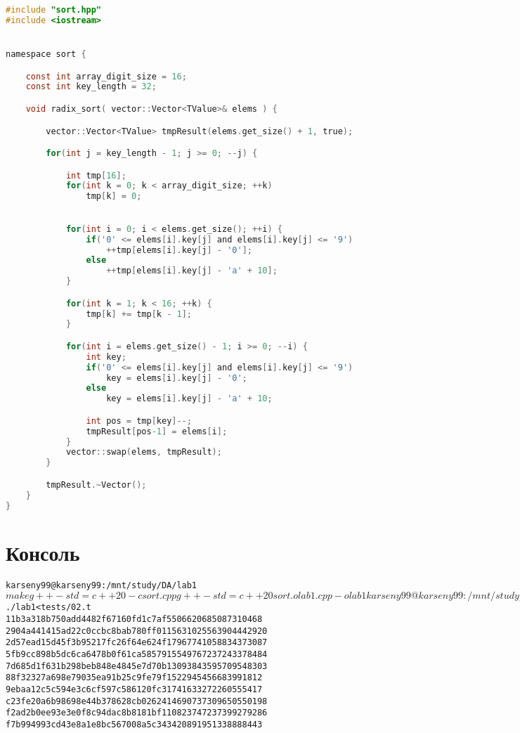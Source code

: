 \begin{lstlisting}[language=C]
#include "sort.hpp"
#include <iostream>


namespace sort {

    const int array_digit_size = 16;
    const int key_length = 32;

    void radix_sort( vector::Vector<TValue>& elems ) {

        vector::Vector<TValue> tmpResult(elems.get_size() + 1, true);

        for(int j = key_length - 1; j >= 0; --j) {

            int tmp[16];
            for(int k = 0; k < array_digit_size; ++k) 
                tmp[k] = 0;
            

            for(int i = 0; i < elems.get_size(); ++i) {
                if('0' <= elems[i].key[j] and elems[i].key[j] <= '9')
                    ++tmp[elems[i].key[j] - '0'];
                else 
                    ++tmp[elems[i].key[j] - 'a' + 10];
            }

            for(int k = 1; k < 16; ++k) {
                tmp[k] += tmp[k - 1];
            }

            for(int i = elems.get_size() - 1; i >= 0; --i) {
                int key;
                if('0' <= elems[i].key[j] and elems[i].key[j] <= '9')
                    key = elems[i].key[j] - '0';
                else    
                    key = elems[i].key[j] - 'a' + 10;

                int pos = tmp[key]--;
                tmpResult[pos-1] = elems[i];
            }
            vector::swap(elems, tmpResult);
        }

        tmpResult.~Vector();
    }
}
\end{lstlisting}

\pagebreak

\section{Консоль}
\begin{alltt}
karseny99@karseny99:/mnt/study/DA/lab1$ make
g++ -std=c++20  -c sort.cpp
g++ -std=c++20  sort.o lab1.cpp -o lab1
karseny99@karseny99:/mnt/study/DA/lab1$ ./lab1 < tests/02.t
11b3a318b750add4482f67160fd1c7af        5506620685087310468
2904a441415ad22c0ccbc8bab780ff01        15631025563904442920
2d57ead15d45f3b95217fc26f64e624f        17967741058834373087
5fb9cc898b5dc6ca6478b0f61ca58579        15549767237243378484
7d685d1f631b298beb848e4845e7d70b        13093843595709548303
88f32327a698e79035ea91b25c9fe79f        1522945456683991812
9ebaa12c5c594e3c6cf597c586120fc3        1741633272260555417
c23fe20a6b98698e44b378628cb02624        14690737309650550198
f2ad2b0ee93e3e0f8c94dac8b8181bf1        10823747237399279286
f7b994993cd43e8a1e8bc567008a5c34        3420891951338888443
\end{alltt}
\pagebreak
